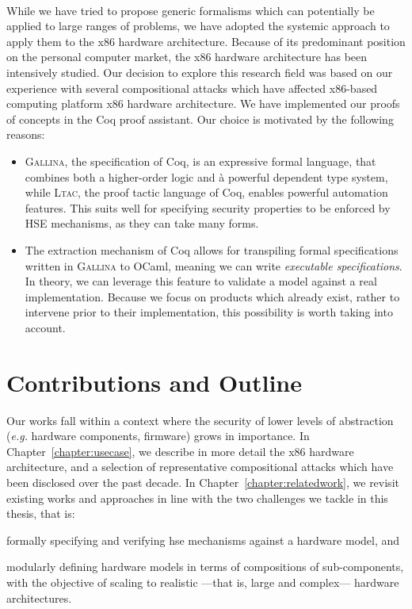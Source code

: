 \paragraph{}
%
While we have tried to propose generic formalisms which can potentially be
applied to large ranges of problems, we have adopted the systemic approach to
apply them to the x86 hardware architecture.
%
Because of its predominant position on the personal computer market, the x86
hardware architecture has been intensively studied.
%
Our decision to explore this research field was based on our experience with
several compositional attacks which have affected x86-based computing platform
x86 hardware architecture.
%
We have implemented our proofs of concepts in the Coq proof assistant.
%
Our choice is motivated by the following reasons:
%
\begin{itemize}
\item {\scshape Gallina}, the specification of Coq, is an expressive formal
  language, that combines both a higher-order logic and à powerful dependent
  type system, while {\scshape Ltac}, the proof tactic language of Coq, enables
  powerful automation features.
  This suits well for specifying security properties to be enforced by HSE
  mechanisms, as they can take many forms.
\item The extraction mechanism of Coq allows for transpiling formal
  specifications written in {\scshape Gallina} to OCaml, meaning we can write
  \emph{executable specifications}.
  In theory, we can leverage this feature to validate a model against a real
  implementation.
  Because we focus on products which already exist, rather to intervene prior to
  their implementation, this possibility is worth taking into account.
\end{itemize}

\section{Contributions and Outline}

Our works fall within a context where the security of lower levels of
abstraction (\emph{e.g.} hardware components, firmware) grows in importance.
%
In Chapter~\ref{chapter:usecase}, we describe in more detail the x86 hardware
architecture, and a selection of representative compositional attacks which have
been disclosed over the past decade.
%
In Chapter~\ref{chapter:relatedwork}, we revisit existing works and approaches
in line with the two challenges we tackle in this thesis, that is:
%
\begin{inparaenum}[(1)]
\item formally specifying and verifying \ac{hse} mechanisms against a hardware
  model, and
%
\item modularly defining hardware models in terms of compositions of
  sub-components, with the objective of scaling to realistic ---that is, large
  and complex--- hardware architectures.
\end{inparaenum}


